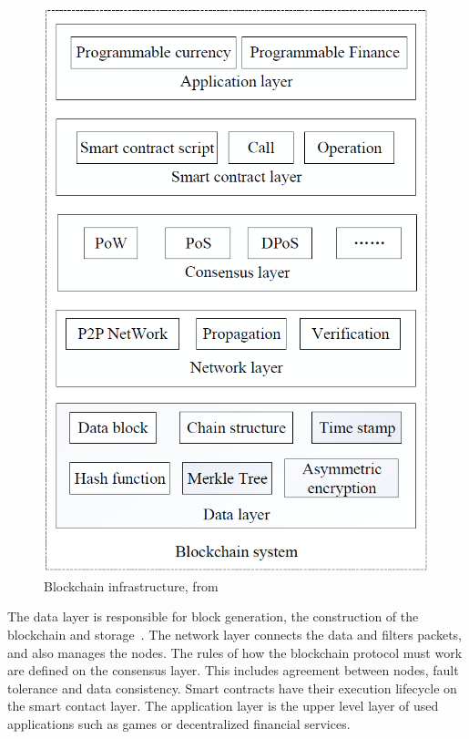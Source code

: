\documentclass[sigconf, nonacm]{acmart}
\begin{document}
  \begin{figure}[h]
    \centering
    \includegraphics[width=\linewidth]{blockchain-layers}
    \caption{Blockchain infrastructure, from \cite{Duan2018}}
    \label{fig:blockchain-layers}
  \end{figure}

The data layer is responsible for block generation, the construction of the blockchain and storage~\cite{Duan2018}. 
The network layer connects the data and filters packets, and also manages the nodes. 
The rules of how the blockchain protocol must work are defined on the consensus layer. 
This includes agreement between nodes, fault tolerance and data consistency. 
Smart contracts have their execution lifecycle on the smart contact layer.
The application layer is the upper level layer of used applications such as games or decentralized financial services. 
\end{document}
